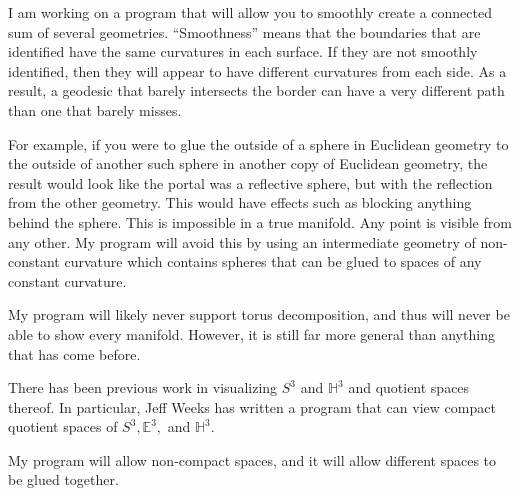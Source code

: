 \documentclass[12pt]{amsart}
\begin{document}

I am working on a program that will allow you to smoothly create a connected sum of several geometries. ``Smoothness'' means that the boundaries that are identified have the same curvatures in each surface. If they are not smoothly identified, then they will appear to have different curvatures from each side. As a result, a geodesic that barely intersects the border can have a very different path than one that barely misses.

For example, if you were to glue the outside of a sphere in Euclidean geometry to the outside of another such sphere in another copy of Euclidean geometry, the result would look like the portal was a reflective sphere, but with the reflection from the other geometry. This would have effects such as blocking anything behind the sphere. This is impossible in a true manifold. Any point is visible from any other. My program will avoid this by using an intermediate geometry of non-constant curvature which contains spheres that can be glued to spaces of any constant curvature.

My program will likely never support torus decomposition, and thus will never be able to show every manifold. However, it is still far more general than anything that has come before.






There has been previous work in visualizing $S^3$ and $\mathbb{H}^3$ and quotient spaces thereof. In particular, Jeff Weeks has written a program that can view compact quotient spaces of $S^3, \mathbb{E}^3,$ and $\mathbb{H}^3$. \cite{CurvedSpaces}

My program will allow non-compact spaces, and it will allow different spaces to be glued together.


\end{document}
